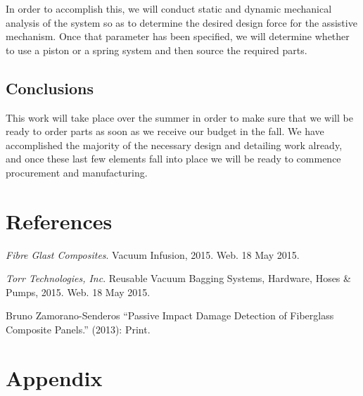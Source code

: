 \documentclass[12pt,letterpaper,notitlepage]{article}
\begin{document}
In order to accomplish this, we will conduct static and dynamic mechanical analysis of the system so as to determine the desired design force for the assistive mechanism. Once that parameter has been specified, we will determine whether to use a piston or a spring system and then source the required parts.\\

\subsection{Conclusions}
This work will take place over the summer in order to make sure that we will be ready to order parts as soon as we receive our budget in the fall. We have accomplished the majority of the necessary design and detailing work already, and once these last few elements fall into place we will be ready to commence procurement and manufacturing.

\section{References}
\begin{thebibliography}{9}
\emph{Fibre Glast Composites}.
Vacuum Infusion, 2015.
Web.
18 May 2015.

\emph{Torr Technologies, Inc}.
Reusable Vacuum Bagging Systems, Hardware, Hoses \& Pumps, 2015.
Web.
18 May 2015.

Bruno Zamorano-Senderos
``Passive Impact Damage Detection of Fiberglass Composite Panels.''
(2013):
Print.
\end{thebibliography}
\section{Appendix}

\end{document}

